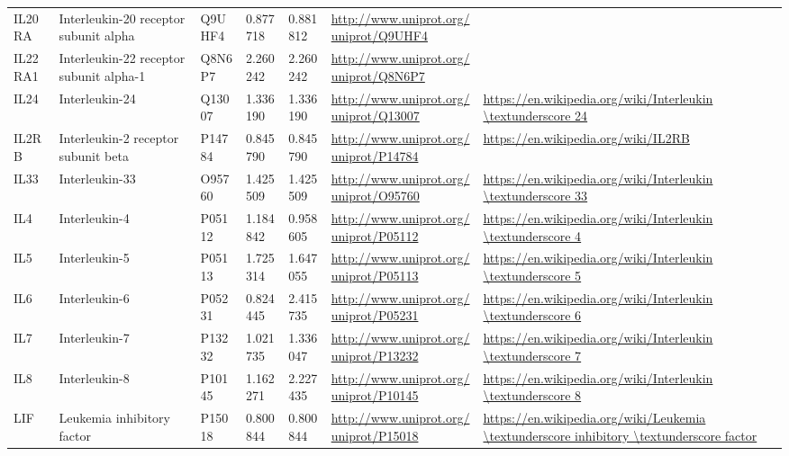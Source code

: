 \begin{table}[H]
\begin{tabular}{ lllllll }
        \multicolumn{1}{l|}{ IL20RA } &  Interleukin-20 receptor subunit alpha   & Q9UHF4   & 0.877718   & 0.881812   & \url{http://www.uniprot.org/uniprot/Q9UHF4}   &           \\ 
        \multicolumn{1}{l|}{ IL22RA1 } &  Interleukin-22 receptor subunit alpha-1   & Q8N6P7   & 2.260242   & 2.260242   & \url{http://www.uniprot.org/uniprot/Q8N6P7}   &           \\ 
        \multicolumn{1}{l|}{ IL24 } &  Interleukin-24   & Q13007   & 1.336190   & 1.336190   & \url{http://www.uniprot.org/uniprot/Q13007}   & \url{https://en.wikipedia.org/wiki/Interleukin \textunderscore 24}          \\ 
        \multicolumn{1}{l|}{ IL2RB } &  Interleukin-2 receptor subunit beta   & P14784   & 0.845790   & 0.845790   & \url{http://www.uniprot.org/uniprot/P14784}   & \url{https://en.wikipedia.org/wiki/IL2RB}          \\ 
        \multicolumn{1}{l|}{ IL33 } &  Interleukin-33   & O95760   & 1.425509   & 1.425509   & \url{http://www.uniprot.org/uniprot/O95760}   & \url{https://en.wikipedia.org/wiki/Interleukin \textunderscore 33}          \\ 
        \multicolumn{1}{l|}{ IL4 } &  Interleukin-4   & P05112   & 1.184842   & 0.958605   & \url{http://www.uniprot.org/uniprot/P05112}   & \url{https://en.wikipedia.org/wiki/Interleukin \textunderscore 4}          \\ 
        \multicolumn{1}{l|}{ IL5 } &  Interleukin-5   & P05113   & 1.725314   & 1.647055   & \url{http://www.uniprot.org/uniprot/P05113}   & \url{https://en.wikipedia.org/wiki/Interleukin \textunderscore 5}          \\ 
        \multicolumn{1}{l|}{ IL6 } &  Interleukin-6   & P05231   & 0.824445   & 2.415735   & \url{http://www.uniprot.org/uniprot/P05231}   & \url{https://en.wikipedia.org/wiki/Interleukin \textunderscore 6}          \\ 
        \multicolumn{1}{l|}{ IL7 } &  Interleukin-7   & P13232   & 1.021735   & 1.336047   & \url{http://www.uniprot.org/uniprot/P13232}   & \url{https://en.wikipedia.org/wiki/Interleukin \textunderscore 7}          \\ 
        \multicolumn{1}{l|}{ IL8 } &  Interleukin-8   & P10145   & 1.162271   & 2.227435   & \url{http://www.uniprot.org/uniprot/P10145}   & \url{https://en.wikipedia.org/wiki/Interleukin \textunderscore 8}          \\ 
        \multicolumn{1}{l|}{ LIF } &  Leukemia inhibitory factor   & P15018   & 0.800844   & 0.800844   & \url{http://www.uniprot.org/uniprot/P15018}   & \url{https://en.wikipedia.org/wiki/Leukemia \textunderscore inhibitory \textunderscore factor}          \\ 

\end{tabular}
\end{table}
